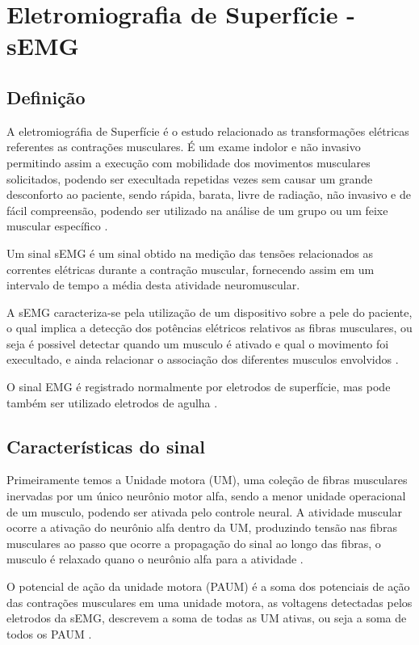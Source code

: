 \chapter{Eletromiografia de Superfície - sEMG}
\section{Definição}
A eletromiográfia de Superfície é o estudo relacionado as transformações elétricas referentes as contrações musculares. É um exame indolor e não invasivo permitindo assim a execução com mobilidade dos movimentos musculares solicitados, podendo ser execultada repetidas vezes sem causar um grande desconforto ao paciente, sendo rápida, barata, livre de radiação, não invasivo e de fácil compreensão, podendo ser utilizado na análise de um grupo ou um feixe muscular específico \cite{de2010eletromiografia}.

Um sinal sEMG é um sinal obtido na medição das tensões relacionados as correntes elétricas durante a contração muscular, fornecendo assim em um intervalo de tempo a média desta atividade neuromuscular\cite{reaz2006techniques}.

A sEMG caracteriza-se pela utilização de um dispositivo sobre a pele do paciente, o qual implica a detecção dos potências elétricos relativos as fibras musculares, ou seja é possivel detectar quando um musculo é ativado e qual o movimento foi execultado, e ainda relacionar o associação dos diferentes musculos envolvidos \cite{botelho2010avaliaccao}.

O sinal EMG é registrado normalmente por eletrodos de superfície, mas pode também ser utilizado eletrodos de agulha \cite{eftaxias2015detection}.

\section{Características do sinal}

Primeiramente temos a Unidade motora (UM), uma coleção de fibras musculares inervadas por um único neurônio motor alfa, sendo a menor unidade operacional de um musculo, podendo ser ativada pelo controle neural. A atividade muscular ocorre a ativação do neurônio alfa dentro da UM, produzindo tensão nas fibras musculares ao passo que ocorre a propagação do sinal ao longo das fibras, o musculo é relaxado quano o neurônio alfa para a atividade \cite{yousefi2014characterizing}.

O potencial de ação da unidade motora (PAUM) é a soma dos potenciais de ação das contrações musculares em uma unidade motora, as voltagens detectadas pelos eletrodos da sEMG, descrevem a soma de todas as UM ativas, ou seja a soma de todos os PAUM \cite{yousefi2014characterizing}.

